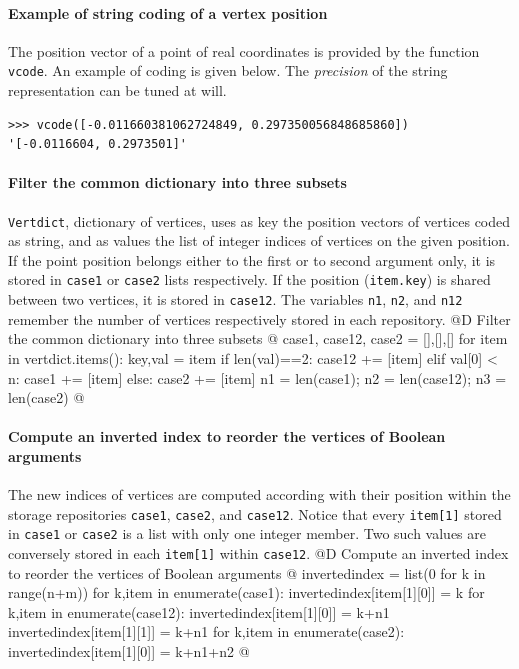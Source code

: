 \documentclass[11pt,oneside]{article}	%
\begin{document}
\paragraph{Example of string coding of a vertex position}
The position vector of a point of real coordinates is provided by the function \texttt{vcode}.
An example of coding is given below. The \emph{precision} of the string representation can be tuned at will.
{\small
\begin{verbatim}
>>> vcode([-0.011660381062724849, 0.297350056848685860])
'[-0.0116604, 0.2973501]'
\end{verbatim}}



\paragraph{Filter the common dictionary into three subsets}
\texttt{Vertdict}, dictionary of vertices, uses as key the position vectors of vertices coded as string, and as values the list of integer indices of vertices on the given position. If the point position belongs either to the first or to second argument only, it is stored in \texttt{case1} or \texttt{case2} lists respectively. If the position (\texttt{item.key}) is shared between two vertices, it is stored in \texttt{case12}.
The variables \texttt{n1}, \texttt{n2}, and \texttt{n12} remember the number of vertices respectively stored in each repository.
@D Filter the common dictionary into three subsets
@{	case1, case12, case2 = [],[],[]
	for item in vertdict.items():
		key,val = item
		if len(val)==2:  case12 += [item]
		elif val[0] < n: case1 += [item]
		else: case2 += [item]
	n1 = len(case1); n2 = len(case12); n3 = len(case2)
@}

\paragraph{Compute an inverted index to reorder the vertices of Boolean arguments}
The new indices of vertices are computed according with their position within the storage repositories \texttt{case1}, \texttt{case2}, and \texttt{case12}. Notice that every \texttt{item[1]} stored in \texttt{case1} or \texttt{case2} is a list with only one integer member. Two such values are conversely stored in each \texttt{item[1]} within \texttt{case12}.
@D Compute an inverted index to reorder the vertices of Boolean arguments 
@{
	invertedindex = list(0 for k in range(n+m))
	for k,item in enumerate(case1):
		invertedindex[item[1][0]] = k
	for k,item in enumerate(case12):
		invertedindex[item[1][0]] = k+n1
		invertedindex[item[1][1]] = k+n1
	for k,item in enumerate(case2):
		invertedindex[item[1][0]] = k+n1+n2
@}
\end{document}
